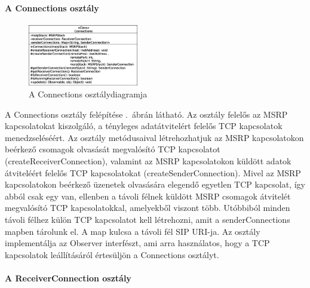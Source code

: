 \paragraph{A Connections osztály\\}
\label{sec:msrp_connections}

\begin{figure}
  \vspace{-15pt}
  \begin{center}
    \includegraphics[width=0.43\textwidth]{img/class_diagrams/Connections.eps}
  \end{center}
  \vspace{-15pt}
  \captionsetup{font=scriptsize}
  \caption{A Connections osztálydiagramja}
   \label{fig:class_connections}
  \vspace{-10pt}
\end{figure}
A Connections osztály felépítése .~ábrán látható. Az osztály felelős az MSRP kapcsolatokat kiszolgáló, a tényleges adatátvitelért felelős TCP kapcsolatok menedzseléséért. Az osztály metódusaival létrehozhatjuk az MSRP kapcsolatokon beérkező csomagok olvasását megvalósító TCP kapcsolatot (\mbox{createReceiverConnection}), valamint az MSRP kapcsolatokon küldött adatok átviteléért felelős TCP kapcsolatokat (\mbox{createSenderConnection}). Mivel az MSRP kapcsolatokon beérkező üzenetek olvasására elegendő egyetlen TCP kapcsolat, így abból csak egy van, ellenben a távoli félnek küldött MSRP csomagok átvitelét megvalósító TCP kapcsolatokkal, amelyekből viszont több. Utóbbiból minden távoli félhez külön TCP kapcsolatot kell létrehozni, amit a senderConnections mapben tárolunk el. A map kulcsa a távoli fél SIP URI-ja. Az osztály implementálja az Observer interfészt, ami arra használatos, hogy a TCP kapcsolatok leállításáról értesüljön a Connections osztályt.

\paragraph{A ReceiverConnection osztály\\}
\label{sec:msrp_receiverconnection}

